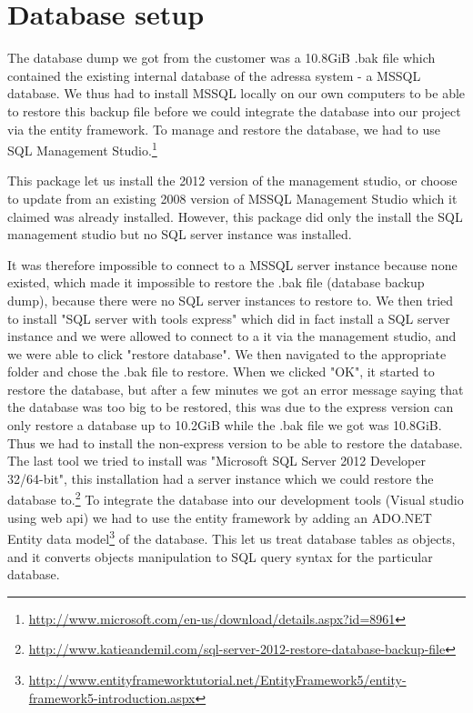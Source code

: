 \section{Database setup}\label{dbSetup}
The database dump we got from the customer was a 10.8GiB .bak file which contained the existing internal database of the adressa system - a MSSQL database.
We thus had to install MSSQL locally on our own computers to be able to restore this backup file before we could integrate the database into our project via the entity framework. To manage and restore the database, we had to use SQL Management Studio.\footnote{\href{http://www.microsoft.com/en-us/download/details.aspx?id=8961}{http://www.microsoft.com/en-us/download/details.aspx?id=8961}}

This package let us install the 2012 version of the management studio, or choose to update from an existing 2008 version of MSSQL Management Studio which it claimed was already installed. However, this package did only the install the SQL management studio but no SQL server instance was installed.

It was therefore impossible to connect to a MSSQL server instance because none existed, which made it impossible to restore the .bak file (database backup dump), because there were no SQL server instances to restore to.
We then tried to install "SQL server with tools express" which did in fact install a SQL server instance and we were allowed to connect to a it via the management studio, and we were able to click "restore database". We then navigated to the appropriate folder and chose the .bak file to restore. When we clicked "OK", it started to restore the database, but after a few minutes we got an error message saying that the database was too big to be restored, this was due to the express version can only restore a database up to 10.2GiB while the .bak file we got was 10.8GiB. Thus we had to install the non-express version to be able to restore the database. The last tool we tried to install was "Microsoft SQL Server 2012 Developer 32/64-bit", this installation had a server instance which we could restore the database to.\footnote{\href{http://www.katieandemil.com/sql-server-2012-restore-database-backup-file}{http://www.katieandemil.com/sql-server-2012-restore-database-backup-file}}
To integrate the database into our development tools (Visual studio using web api) we had to use the entity framework by adding an ADO.NET Entity data model\footnote{\href{http://www.entityframeworktutorial.net/EntityFramework5/entity-framework5-introduction.aspx}{http://www.entityframeworktutorial.net/EntityFramework5/entity-framework5-introduction.aspx}} of the database.
This let us treat database tables as objects, and it converts objects manipulation to SQL query syntax for the particular database.